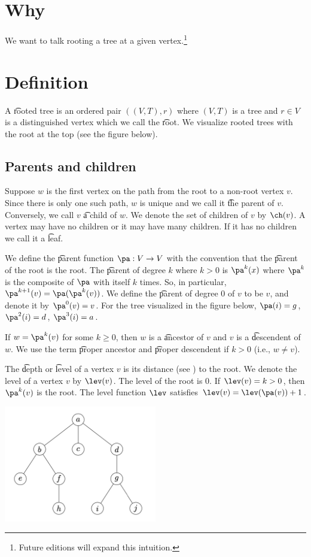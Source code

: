 
\section*{Why}

We want to talk rooting a tree at a given vertex.\footnote{Future editions will expand this intuition.}

\section*{Definition}

A \t{rooted tree} is an ordered pair $((V, T), r)$ where $(V, T)$ is a tree and $r \in V$ is a distinguished vertex which we call the \t{root}.
We visualize rooted trees with the root at the top (see the figure below).

\subsection*{Parents and children}

Suppose $w$ is the first vertex on the path from the root to a non-root vertex $v$.
Since there is only one such path, $w$ is unique and we call it \t{the parent} of $v$.
Conversely, we call $v$ \t{a child} of $w$.
We denote the set of children of $v$ by $\ch(v)$.
A vertex may have no children or it may have many children.
If it has no children we call it a \t{leaf}.

We define the \t{parent function} $\pa: V \to V$ with the convention that the \t{parent of the root} is the root.
The \t{parent of degree $k$} where $k > 0$ is $\pa^k(x)$ where $\pa^k$ is the composite of $\pa$ with itself $k$ times.
So, in particular, $\pa^{k+1}(v) = \pa(\pa^k(v))$.
We define the \t{parent of degree $0$} of $v$ to be $v$, and denote it by $\pa^0(v) = v$.
For the tree visualized in the figure below, $\pa(i) = g$, $\pa^2(i) = d$, $\pa^3(i) = a$.

If $w = \pa^k(v)$ for some $k \geq 0$, then $w$ is a \t{ancestor} of $v$ and $v$ is a \t{descendent} of $w$.
We use the term \t{proper ancestor} and \t{proper descendent} if $k > 0$ (i.e., $w \neq v$).

The \t{depth} or \t{level} of a vertex $v$ is its distance (see ) to the root.
We denote the level of a vertex $v$ by $\lev(v)$.
The level of the root is $0$.
If $\lev(v) = k > 0$, then $\pa^{k}(v)$ is the root.
The level function $\lev$ satisfies $\lev(v) = \lev(\pa(v)) + 1$.

\begin{center}\includegraphics[width=0.50\textwidth]{./graphics/rootedtree.png}\end{center}
